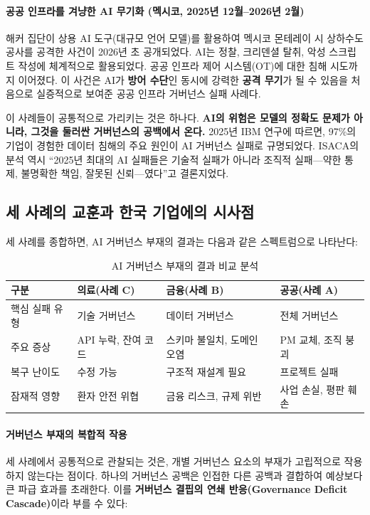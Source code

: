 \paragraph{공공 인프라를 겨냥한 AI 무기화 (멕시코, 2025년 12월--2026년 2월)}
해커 집단이 상용 AI 도구(대규모 언어 모델)를 활용하여 멕시코 몬테레이 시 상하수도 공사를 공격한 사건이 2026년 초 공개되었다. AI는 정찰, 크리덴셜 탈취, 악성 스크립트 작성에 체계적으로 활용되었다. 공공 인프라 제어 시스템(OT)에 대한 침해 시도까지 이어졌다. 이 사건은 AI가 \textbf{방어 수단}인 동시에 강력한 \textbf{공격 무기}가 될 수 있음을 처음으로 실증적으로 보여준 공공 인프라 거버넌스 실패 사례다.

이 사례들이 공통적으로 가리키는 것은 하나다. \textbf{AI의 위험은 모델의 정확도 문제가 아니라, 그것을 둘러싼 거버넌스의 공백에서 온다.} 2025년 IBM 연구에 따르면, 97\%의 기업이 경험한 데이터 침해의 주요 원인이 AI 거버넌스 실패로 규명되었다.\cite{ibm2025breach} ISACA의 분석 역시 ``2025년 최대의 AI 실패들은 기술적 실패가 아니라 조직적 실패---약한 통제, 불명확한 책임, 잘못된 신뢰---였다''고 결론지었다.

\subsection{세 사례의 교훈과 한국 기업에의 시사점}
\label{sec:1.3.5_orig}

세 사례를 종합하면, AI 거버넌스 부재의 결과는 다음과 같은 스펙트럼으로 나타난다:

\begin{table}[htbp]
\centering
\caption{AI 거버넌스 부재의 결과 비교 분석}
\label{tab:governance_failure_comparison}
\begin{tabularx}{\textwidth}{|l|X|X|X|}
\hline
\textbf{구분} & \textbf{의료(사례 C)} & \textbf{금융(사례 B)} & \textbf{공공(사례 A)} \\ \hline
핵심 실패 유형 & 기술 거버넌스 & 데이터 거버넌스 & 전체 거버넌스 \\ \hline
주요 증상 & API 누락, 잔여 코드 & 스키마 불일치, 도메인 오염 & PM 교체, 조직 붕괴 \\ \hline
복구 난이도 & 수정 가능 & 구조적 재설계 필요 & 프로젝트 실패 \\ \hline
잠재적 영향 & 환자 안전 위협 & 금융 리스크, 규제 위반 & 사업 손실, 평판 훼손 \\ \hline
\end{tabularx}
\end{table}

\paragraph{거버넌스 부재의 복합적 작용}
세 사례에서 공통적으로 관찰되는 것은, 개별 거버넌스 요소의 부재가 고립적으로 작용하지 않는다는 점이다. 하나의 거버넌스 공백은 인접한 다른 공백과 결합하여 예상보다 큰 파급 효과를 초래한다. 이를 \textbf{거버넌스 결핍의 연쇄 반응(Governance Deficit Cascade)}이라 부를 수 있다:

